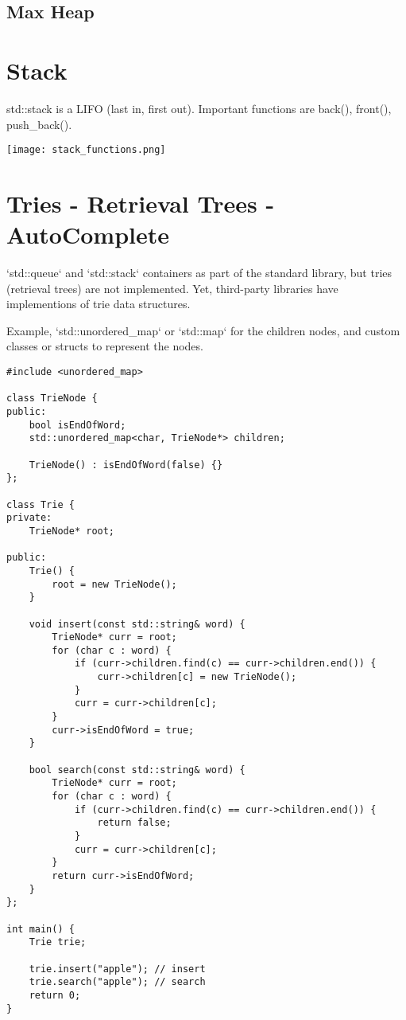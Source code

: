\subsection{Max Heap}

\section{Stack}

std::stack is a LIFO (last in, first out). Important functions are back(), front(), push\_back().

\begin{center}
    \texttt{[image: stack\_functions.png]}
\end{center}

\section{Tries - Retrieval Trees - AutoComplete}

`std::queue` and `std::stack` containers as part of the standard library,
but tries (retrieval trees) are not implemented. 
Yet, third-party libraries have implementions of trie data structures.

Example, `std::unordered\_map` or `std::map` for the children nodes,
and custom classes or structs to represent the nodes.

\begin{verbatim}
#include <unordered_map>

class TrieNode {
public:
    bool isEndOfWord;
    std::unordered_map<char, TrieNode*> children;

    TrieNode() : isEndOfWord(false) {}
};

class Trie {
private:
    TrieNode* root;

public:
    Trie() {
        root = new TrieNode();
    }

    void insert(const std::string& word) {
        TrieNode* curr = root;
        for (char c : word) {
            if (curr->children.find(c) == curr->children.end()) {
                curr->children[c] = new TrieNode();
            }
            curr = curr->children[c];
        }
        curr->isEndOfWord = true;
    }

    bool search(const std::string& word) {
        TrieNode* curr = root;
        for (char c : word) {
            if (curr->children.find(c) == curr->children.end()) {
                return false;
            }
            curr = curr->children[c];
        }
        return curr->isEndOfWord;
    }
};

int main() {
    Trie trie;
    
    trie.insert("apple"); // insert
    trie.search("apple"); // search
    return 0;
}
\end{verbatim}

